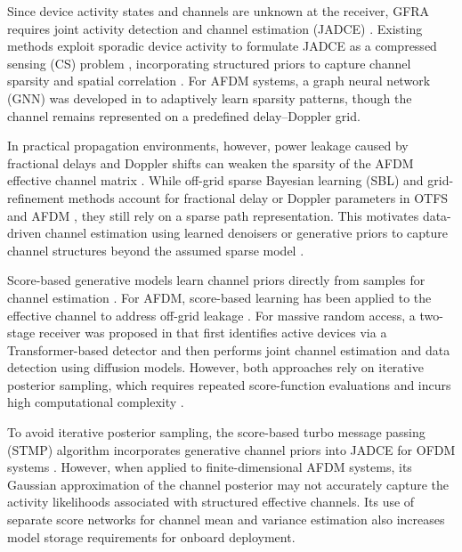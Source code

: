Since device activity states and channels are unknown at the receiver, GFRA
requires joint activity detection and channel estimation (JADCE)
\cite{cai2026,shen2025,zhang2020_brmp}. Existing methods exploit sporadic
device activity to formulate JADCE as a compressed sensing (CS) problem
\cite{liu2018,zhang2019_dnn_bsbl}, incorporating structured priors to capture
channel sparsity \cite{shen2025,ding2026,shen2022_mimootfs,ke2020} and spatial
correlation \cite{djelouat2024_hierarchical}. For AFDM systems, a graph neural
network (GNN) was developed in \cite{ding2026} to adaptively learn sparsity
patterns, though the channel remains represented on a predefined
delay--Doppler grid.

In practical propagation environments, however, power leakage caused by
fractional delays and Doppler shifts can weaken the sparsity of the AFDM
effective channel matrix \cite{huang2026}. While off-grid sparse Bayesian
learning (SBL) and grid-refinement methods account for fractional delay or
Doppler parameters in OTFS \cite{WeiEtAl2022OffgridSBL} and AFDM
\cite{li2025_afdm_sbl,luo2026_afdm_fdfd}, they still rely on a sparse path
representation. This motivates data-driven channel estimation using learned
denoisers \cite{metzler2016,he2018_ldamp} or generative priors
\cite{balevi2021_generative} to capture channel structures beyond the assumed
sparse model \cite{cai2026,huang2026}.

Score-based generative models learn channel priors directly from samples for
channel estimation
\cite{song2019,arvinte2023,zhou2025_diffusion,chen2025_variational,fesl2024_diffusion}.
For AFDM, score-based learning has been applied to the effective channel to
address off-grid leakage \cite{huang2026}. For massive random access, a
two-stage receiver was proposed in \cite{ying2026} that first identifies
active devices via a Transformer-based detector and then performs joint
channel estimation and data detection using diffusion models. However, both
approaches rely on iterative posterior sampling, which requires repeated
score-function evaluations and incurs high computational complexity
\cite{huang2026,ying2026}.

To avoid iterative posterior sampling, the score-based turbo message passing
(STMP) algorithm incorporates generative channel priors into JADCE for OFDM
systems \cite{cai2026}. However, when applied to finite-dimensional AFDM
systems, its Gaussian approximation of the channel posterior may not accurately
capture the activity likelihoods associated with structured effective channels.
Its use of separate score networks for channel mean and variance estimation
also increases model storage requirements for onboard deployment.

